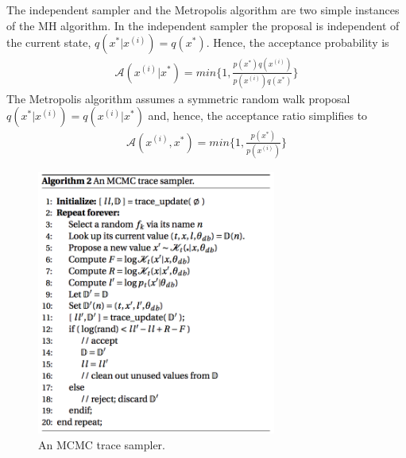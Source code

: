 The independent sampler and the Metropolis algorithm are two simple instances of the MH algorithm. In the independent sampler the proposal is independent of the current state, $q(x^* | x^{(i)}) = q(x^*)$. Hence, the acceptance probability is
\begin{align*}
  \mathscr{A}(x^{(i)} | x^*) = min \{1, \frac{p(x^*)q(x^{(i)})}{p(x^{(i)})q(x^*)}\}
\end{align*}
The Metropolis algorithm assumes a symmetric random walk proposal $q(x^* | x^{(i)}) = q(x^{(i)} | x^*)$ and, hence, the acceptance ratio simplifies to
\begin{align*}
  \mathscr{A}(x^{(i)}, x^*) = min \{ 1, \frac{p(x^*)}{p(x^{(i)})} \}
\end{align*}

\begin{figure}
    \centering
    \includegraphics[width=0.7\textwidth]{figures/trace1.png}
    \caption{An MCMC trace sampler.}
    \label{fig:trace1}
\end{figure}

